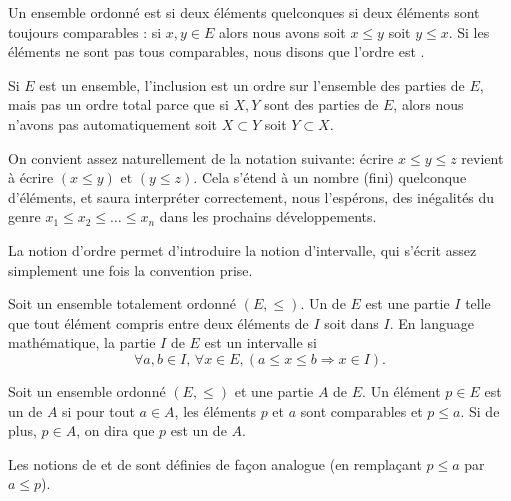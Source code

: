 \begin{definition}      \label{DEFooVGYQooUhUZGr}
	Un ensemble ordonné est  si deux éléments quelconques si deux éléments sont toujours comparables : si \( x,y\in E\) alors nous avons soit \( x\leq y\) soit \( y\leq x\). Si les éléments ne sont pas tous comparables, nous disons que l'ordre est .
\end{definition}

\begin{example}  \label{ExeooOrdreInclusion}
	Si \( E\) est un ensemble, l'inclusion est un ordre sur l'ensemble des parties de \( E\), mais pas un ordre total parce que si \( X,Y\) sont des parties de \( E\), alors nous n'avons pas automatiquement soit \( X\subset Y\) soit \( Y\subset X\).
\end{example}

\begin{normaltext}\label{NORMooIntroIntervalleOrdonne}
	On convient assez naturellement de la notation suivante: écrire \( x \leq y \leq z \) revient à écrire \( (x \leq y)\text{ et } (y \leq z) \). Cela s'étend à un nombre (fini) quelconque d'éléments, et  saura interpréter correctement, nous l'espérons, des inégalités du genre \( x_1 \leq x_2 \leq \dots \leq x_n \) dans les prochains développements.

	La notion d'ordre permet d'introduire la notion d'intervalle, qui s'écrit assez simplement une fois la convention prise.
\end{normaltext}

\begin{definition}  \label{DefEYAooMYYTz}
	Soit un ensemble totalement ordonné \( (E,\leq)\). Un  de \( E\) est une partie \( I\) telle que tout élément compris entre deux éléments de \( I \) soit dans \( I \). En language mathématique, la partie \( I \) de \( E\) est un intervalle si
	\[
		\forall a,b\in I,\, \forall x \in E, (a\leq x\leq b \Rightarrow x\in I).
	\]
\end{definition}

\begin{definition}      \label{DEFooDNWRooTiMAzK}
	Soit un ensemble ordonné \( (E,\leq)\) et une partie \( A\) de \( E\). Un élément \( p\in E\) est un  de \( A\) si pour tout \( a\in A\), les éléments \( p\) et \( a\) sont comparables et \( p\leq a\). Si de plus, \( p \in A \), on dira que \( p \) est un  de \( A\).

	Les notions de  et de  sont définies de façon analogue (en remplaçant \( p\leq a\) par \( a\leq p\)).
\end{definition}

